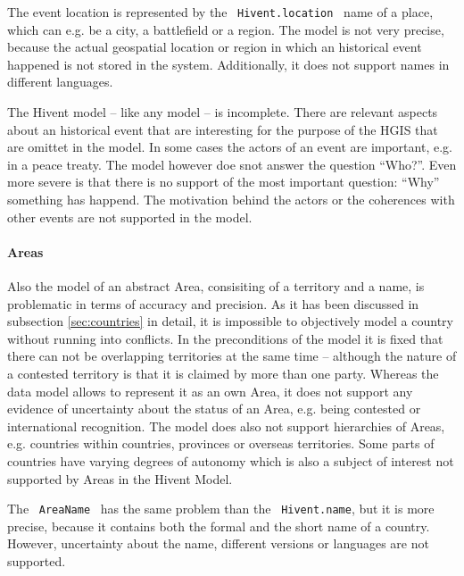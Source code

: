 The event location is represented by the ~\texttt{Hivent.location}~ name of a place, which can e.g. be a city, a battlefield or a region. The model is not very precise, because the actual geospatial location or region in which an historical event happened is not stored in the system. Additionally, it does not support names in different languages.

The Hivent model -- like any model -- is incomplete. There are relevant aspects about an historical event that are interesting for the purpose of the HGIS that are omittet in the model. In some cases the actors of an event are important, e.g. in a peace treaty. The model however doe snot answer the question ``Who?''. Even more severe is that there is no support of the most important question: ``Why'' something has happend. The motivation behind the actors or the coherences with other events are not supported in the model.


\paragraph{Areas} %
\label{par:evaluation_areas}

Also the model of an abstract Area, consisiting of a territory and a name, is problematic in terms of accuracy and precision. As it has been discussed in subsection \ref{sec:countries} in detail, it is impossible to objectively model a country without running into conflicts.
In the preconditions of the model it is fixed that there can not be overlapping territories at the same time -- although the nature of a contested territory is that it is claimed by more than one party. Whereas the data model allows to represent it as an own Area, it does not support any evidence of uncertainty about the status of an Area, e.g. being contested or international recognition.
The model does also not support hierarchies of Areas, e.g. countries within countries, provinces or overseas territories. Some parts of countries have varying degrees of autonomy which is also a subject of interest not supported by Areas in the Hivent Model.

The ~\texttt{AreaName}~ has the same problem than the ~\texttt{Hivent.name}, but it is more precise, because it contains both the formal and the short name of a country. However, uncertainty about the name, different versions or languages are not supported.

